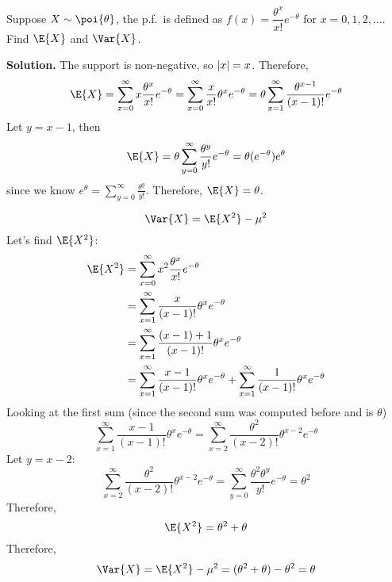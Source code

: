\begin{Example}{}{}
    Suppose $ X \sim \poi{\theta} $, the p.f.\ is defined as
    $ f(x)=\dfrac{\theta^x}{x!} e^{-\theta} $
    for $ x=0,1,2,\ldots $. Find $ \E{X} $ and $ \Var{X} $.

    \textbf{Solution.} The support is non-negative, so $ \lvert x\rvert=x $.
    Therefore,
    \[ \E{X}=\sum\limits_{x=0}^{\infty} x \frac{\theta^x}{x!} e^{-\theta}
        =\sum\limits_{x=0}^{\infty} \frac{x}{x!} \theta^x e^{-\theta}
        =\theta \sum\limits_{x=1}^{\infty} \frac{\theta^{x-1}}{(x-1)!}
        e^{-\theta}  \]
    Let $ y=x-1 $, then
    \[ \E{X}= \theta\sum\limits_{y=0}^{\infty} \frac{\theta^y}{y!} e^{-\theta}=\theta(e^{-\theta})e^{\theta} \]
    since we know $\displaystyle  e^{\theta}=\sum\limits_{y=0}^{\infty} \frac{\theta^y}{y!} $.
    Therefore, $ \E{X}= \theta $.

    \[ \Var{X}=\E{X^2}-\mu^2 \]
    Let's find $ \E{X^2} $:
    \begin{align*}
        \E{X^2}
         & =\sum\limits_{x=0}^{\infty} x^2 \frac{\theta^x}{x!} e^{-\theta}         \\
         & =\sum\limits_{x=1}^{\infty} \frac{x}{(x-1)!}\theta^x e^{-\theta}        \\
         & =\sum\limits_{x=1}^{\infty} \frac{(x-1)+1}{(x-1)!} \theta^x e^{-\theta} \\
         & =\sum\limits_{x=1}^{\infty} \frac{x-1}{(x-1)!}\theta^x e^{-\theta}+
        \sum\limits_{x=1}^{\infty} \frac{1}{(x-1)!}\theta^x e^{-\theta}
    \end{align*}
    Looking at the first sum (since the second sum was computed before
    and is $ \theta $)
    \[ \sum\limits_{x=1}^{\infty} \frac{x-1}{(x-1)!}\theta^x e^{-\theta}=
        \sum\limits_{x=2}^{\infty} \frac{\theta^2}{(x-2)!} \theta^{x-2}e^{-\theta} \]
    Let $ y=x-2 $:
    \[ \sum\limits_{x=2}^{\infty} \frac{\theta^2}{(x-2)!} \theta^{x-2}e^{-\theta}=
        \sum\limits_{y=0}^{\infty}\frac{\theta^2\theta^y}{y!}e^{-\theta}=
        \theta^2 \]
    Therefore,
    \[ \E{X^2}=\theta^2+\theta   \]
    Therefore,
    \[ \Var{X}=\E{X^2}-\mu^2=(\theta^2+\theta)-\theta^2=\theta \]
\end{Example}
